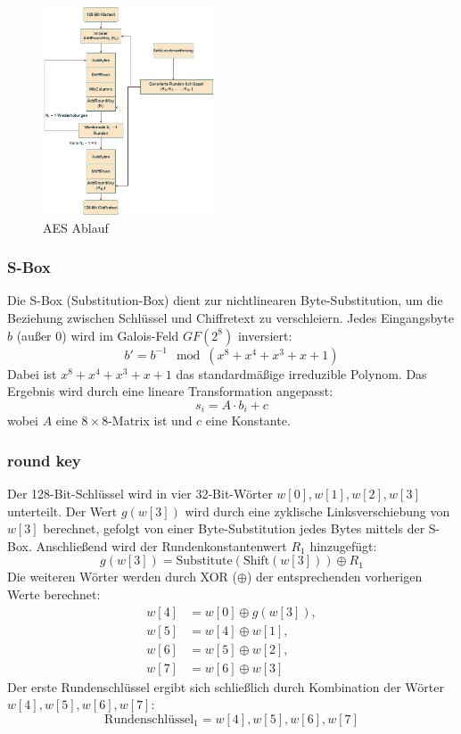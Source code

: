 \begin{figure}[H]
	\centering
	\includegraphics[width=0.45\textwidth]{sections/matheo/final.jpg}
	\caption{AES Ablauf}
	\label{fig:qualen_AES}
\end{figure}



\subsubsection{S-Box}
Die S-Box (Substitution-Box) dient zur nichtlinearen Byte-Substitution, um die Beziehung zwischen Schlüssel und Chiffretext zu verschleiern. Jedes Eingangsbyte \(b\) (außer 0) wird im Galois-Feld \(GF(2^8)\) inversiert:
\[
b' = b^{-1} \mod (x^8 + x^4 + x^3 + x + 1)
\]
Dabei ist \(x^8 + x^4 + x^3 + x + 1\) das standardmäßige irreduzible Polynom. Das Ergebnis wird durch eine lineare Transformation angepasst:
\[
s_i = A \cdot b_i + c
\]
wobei \(A\) eine $8 \times 8$-Matrix ist und \(c\) eine Konstante.\cite{Endliche_körper}\cite{S_Box}

\subsubsection{round key}

Der 128-Bit-Schlüssel wird in vier 32-Bit-Wörter $w[0], w[1], w[2], w[3]$ unterteilt. 
Der Wert $g(w[3])$ wird durch eine zyklische Linksverschiebung von $w[3]$ berechnet, 
gefolgt von einer Byte-Substitution jedes Bytes mittels der S-Box. Anschließend wird 
der Rundenkonstantenwert $R_1$ hinzugefügt:
\[
g(w[3]) = \text{Substitute}(\text{Shift}(w[3])) \oplus R_1
\]
Die weiteren Wörter werden durch XOR ($\oplus$) der entsprechenden vorherigen Werte berechnet:
\begin{align*}
w[4] &= w[0] \oplus g(w[3]), \\
w[5] &= w[4] \oplus w[1], \\
w[6] &= w[5] \oplus w[2], \\
w[7] &= w[6] \oplus w[3]
\end{align*}
Der erste Rundenschlüssel ergibt sich schließlich durch Kombination der Wörter $w[4], w[5], w[6], w[7]$:
\[
\text{Rundenschlüssel}_1 = w[4], w[5], w[6], w[7]
\]

